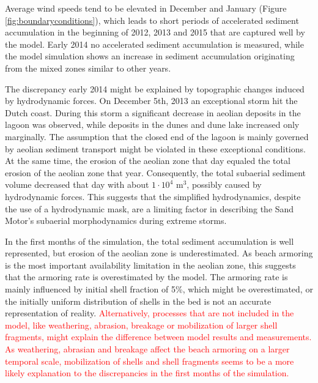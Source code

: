Average wind speeds tend to be elevated in December and January
(Figure \ref{fig:boundaryconditions}), which leads to short periods of
accelerated sediment accumulation in the beginning of 2012, 2013 and
2015 that are captured well by the model. Early 2014 no accelerated
sediment accumulation is measured, while the model simulation shows an
increase in sediment accumulation originating from the mixed zones
similar to other years.

The discrepancy early 2014 might be explained by topographic changes
induced by hydrodynamic forces. On December 5th, 2013 an exceptional
storm hit the Dutch coast. During this storm a significant decrease in
aeolian deposits in the lagoon was observed, while deposits in the
dunes and dune lake increased only marginally. The assumption that the
closed end of the lagoon is mainly governed by aeolian sediment
transport might be violated in these exceptional conditions. At the
same time, the erosion of the aeolian zone that day equaled the total
erosion of the aeolian zone that year. Consequently, the total
subaerial sediment volume decreased that day with about $\mathrm{1
  \cdot 10^4}$ $\mathrm{m^3}$, possibly caused by hydrodynamic
forces. This suggests that the simplified hydrodynamics, despite the
use of a hydrodynamic mask, are a limiting factor in describing the
Sand Motor's subaerial morphodynamics during extreme storms.

In the first months of the simulation, the total sediment accumulation
is well represented, but erosion of the aeolian zone is
underestimated. As beach armoring is the most important availability
limitation in the aeolian zone, this suggests that the armoring rate
is overestimated by the model. The armoring rate is mainly influenced
by initial shell fraction of 5\%, which might be overestimated, or the
initially uniform distribution of shells in the bed is not an accurate
representation of reality. \textcolor{red}{Alternatively, processes
  that are not included in the model, like weathering, abrasion,
  breakage or mobilization of larger shell fragments, might explain
  the difference between model results and measurements. As
  weathering, abrasian and breakage affect the beach armoring on a
  larger temporal scale, mobilization of shells and shell fragments
  seems to be a more likely explanation to the discrepancies in the
  first months of the simulation.}

